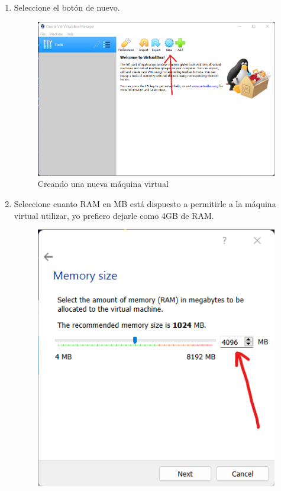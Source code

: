 \documentclass[stu, 12pt, letterpaper, donotrepeattitle, floatsintext, natbib, helv]{apa7}
\begin{document}
\begin{enumerate}
    \item Seleccione el botón de nuevo.
    \begin{figure} [H]
        \includegraphics[width = 1\textwidth]{New.png}
        \caption{Creando una nueva máquina virtual}
        \label{fig:New}
    \end{figure}
    \item Seleccione cuanto RAM en MB está dispuesto a permitirle a la máquina virtual utilizar, yo prefiero dejarle como 4GB de RAM.
    \begin{figure} [H]
        \includegraphics[width = 1\textwidth]{RAMSelection.png}

\end{figure}
\end{enumerate}
\end{document}
